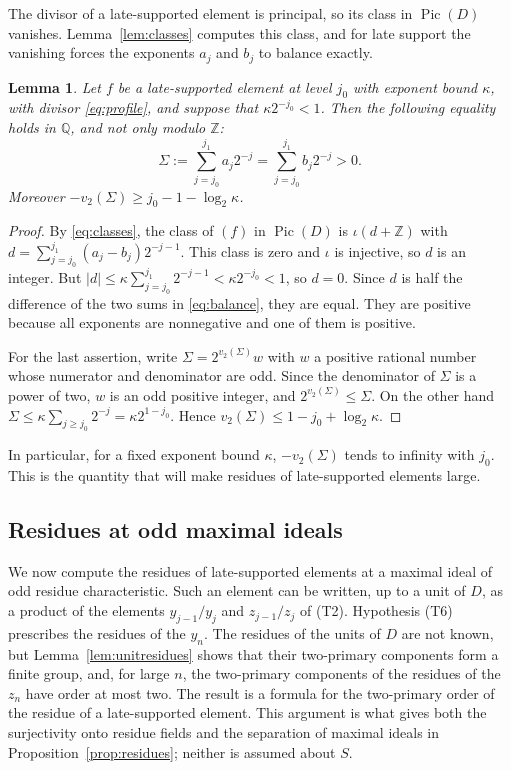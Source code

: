 \documentclass[11pt]{article}
\theoremstyle{plain}
\newtheorem{lemma}[theorem]{Lemma}
\theoremstyle{definition}
\theoremstyle{remark}
\DeclareMathOperator{\Pic}{Pic}
\newcommand{\Z}{\mathbb Z}
\newcommand{\Q}{\mathbb Q}
\begin{document}
The divisor of a late-supported element is principal, so its class in
$\Pic(D)$ vanishes.  Lemma~\ref{lem:classes} computes this class, and
for late support the vanishing forces the exponents $a_j$ and $b_j$ to
balance exactly.

\begin{lemma}\label{lem:balance}
Let $f$ be a late-supported element at level $j_0$ with exponent bound
$\kappa$, with divisor \eqref{eq:profile}, and suppose that
$\kappa2^{-j_0}<1$.  Then the following equality holds in $\Q$, and not
only modulo $\Z$:
\begin{equation}\label{eq:balance}
 \Sigma:=\sum_{j=j_0}^{j_1} a_j2^{-j}
   =\sum_{j=j_0}^{j_1} b_j2^{-j}>0.
\end{equation}
Moreover $-v_2(\Sigma)\geq j_0-1-\log_2\kappa$.
\end{lemma}
\begin{proof}
By \eqref{eq:classes}, the class of $(f)$ in $\Pic(D)$ is
$\iota(d+\Z)$ with $d=\sum_{j=j_0}^{j_1}(a_j-b_j)2^{-j-1}$.  This class is
zero and $\iota$ is injective, so $d$ is an integer.  But
$|d|\leq\kappa\sum_{j=j_0}^{j_1}2^{-j-1}<\kappa2^{-j_0}<1$, so $d=0$.
Since $d$ is half the difference of the two sums in \eqref{eq:balance},
they are equal.  They are positive because all exponents are nonnegative
and one of them is positive.

For the last assertion, write $\Sigma=2^{v_2(\Sigma)}w$ with $w$ a
positive rational number whose numerator and denominator are odd.  Since
the denominator of $\Sigma$ is a power of two, $w$ is an odd positive
integer, and $2^{v_2(\Sigma)}\leq\Sigma$.  On the other hand
$\Sigma\leq\kappa\sum_{j\geq j_0}2^{-j}=\kappa2^{1-j_0}$.  Hence
$v_2(\Sigma)\leq1-j_0+\log_2\kappa$.
\end{proof}

In particular, for a fixed exponent bound $\kappa$, $-v_2(\Sigma)$ tends
to infinity with $j_0$.  This is the quantity that will make residues of
late-supported elements large.

\subsection{Residues at odd maximal ideals}\label{sec:orders-residues}

We now compute the residues of late-supported elements at a maximal ideal
of odd residue characteristic.  Such an element can be written, up to a
unit of $D$, as a product of the elements $y_{j-1}/y_j$ and
$z_{j-1}/z_j$ of (T2).  Hypothesis (T6) prescribes the residues of the
$y_n$.  The residues of the units of $D$ are not known, but
Lemma~\ref{lem:unitresidues} shows that their two-primary components
form a finite group, and,
for large $n$, the two-primary components of the residues of the $z_n$
have order at most two.  The result is a formula for
the two-primary order of the residue of a late-supported element.  This
argument is what gives both the surjectivity onto residue fields and the
separation of maximal ideals in Proposition~\ref{prop:residues}; neither is
assumed about $S$.
\end{document}
